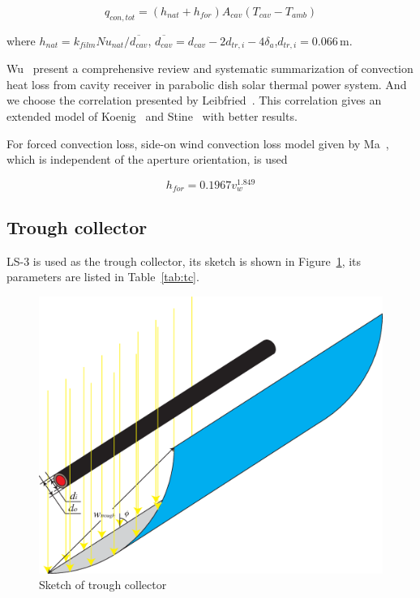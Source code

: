 \documentclass{article}
\begin{document}
\begin{equation*}
	q_{con,tot} = (h_{nat} + h_{for})A_{cav}(T_{cav}-T_{amb})
\end{equation*}


where $h_{nat}=k_{film}Nu_{nat}/\overline{d_{cav}}$, $\overline{d_{cav}}=d_{cav}-2d_{tr,i}-4 \delta_a$,$d_{tr,i}=0.066\,$m.

Wu~\cite{Wu2010} present a comprehensive review and systematic summarization of convection heat loss from cavity receiver in parabolic dish solar thermal power system. And we choose the correlation presented by Leibfried~\cite{Leibfried1995}. This correlation gives an extended model of Koenig~\cite{Koenig1981} and Stine~\cite{Stine1994} with better results.

For forced convection loss, side-on wind convection loss model given by Ma~\cite{Ma1993}, which is independent of the aperture orientation, is used

\begin{equation*}
	h_{for}=0.1967v_w^{1.849}
\end{equation*}

\subsection{Trough collector}

LS-3 is used as the trough collector, its sketch is shown in Figure~\ref{fig:tc}, its parameters are listed in Table~\ref{tab:tc}.

\noindent \begin{figure}[htbp]
\begin{center}
	\includegraphics[width = 0.7\columnwidth]{./graphics/TroughCollector}
	\caption{Sketch of trough collector}
	\label{fig:tc}
\end{center}
\end{figure}
\end{document}
